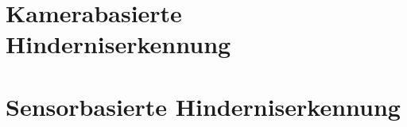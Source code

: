 \section{Kamerabasierte Hinderniserkennung}
\label{sec:kamera_basierte_he}

\section{Sensorbasierte Hinderniserkennung}
\label{sec:technische_voraussetzungen}
